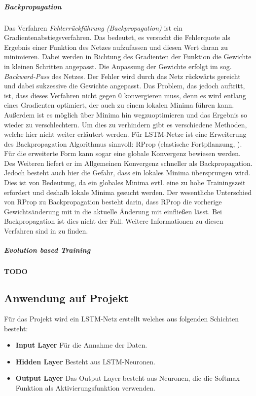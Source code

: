 \subparagraph{Backpropagation}
Das Verfahren \textit{Fehlerrückführung (Backpropagation)} ist ein
Gradientenabstiegsverfahren. Das bedeutet, es versucht die Fehlerquote als
Ergebnis einer Funktion des Netzes aufzufassen und diesen Wert daran zu
minimieren. Dabei werden in Richtung des Gradienten der Funktion die Gewichte in
kleinen Schritten angepasst. Die Anpassung der Gewichte erfolgt im sog.
\textit{Backward-Pass} des Netzes. Der Fehler wird durch das Netz rückwärts
gereicht und dabei sukzessive die Gewichte angepasst. Das Problem, das jedoch
auftritt, ist, dass dieses Verfahren nicht gegen 0 konvergieren muss, denn es
wird entlang eines Gradienten optimiert, der auch zu einem lokalen Minima führen
kann. Außerdem ist es möglich über Minima hin wegzuoptimieren und das Ergebnis so
wieder zu verschlechtern. Um dies zu verhindern gibt es verschiedene Methoden,
welche hier nicht weiter erläutert werden. Für \ac{LSTM}-Netze ist eine
Erweiterung des Backpropagation Algorithmus sinnvoll:
\acl{RProp} (elastische Fortpflanzung, ). Für die erweiterte Form
kann sogar eine globale Konvergenz bewiesen werden. Des Weiteren liefert er im
Allgemeinen Konvergenz schneller als Backpropagation. Jedoch besteht auch hier
die Gefahr, dass ein lokales Minima übersprungen wird. Dies ist von Bedeutung,
da ein globales Minima evtl. eine zu hohe Trainingszeit erfordert und deshalb
lokale Minima gesucht werden. Der wesentliche Unterschied von \ac{RProp} zu
Backpropagation besteht darin, dass \ac{RProp} die vorherige Gewichtsänderung
mit in die aktuelle Änderung mit einfließen lässt. Bei Backpropagation ist dies
nicht der Fall. Weitere Informationen zu diesen Verfahren sind in
\cite{RainerSchmoll2006,Gers2002b,GERS2001} zu finden. 

\subparagraph{Evolution based Training}

\textbf{TODO}


\subsection{Anwendung auf Projekt}
Für das Projekt wird ein LSTM-Netz erstellt welches aus folgenden Schichten besteht:

\begin{itemize}
\item \textbf{Input Layer} Für die Annahme der Daten.
\item \textbf{Hidden Layer} Besteht aus LSTM-Neuronen.
\item \textbf{Output Layer} Das Output Layer besteht aus Neuronen, die die 
Softmax Funktion als Aktivierungsfunktion verwenden.
\end{itemize}

